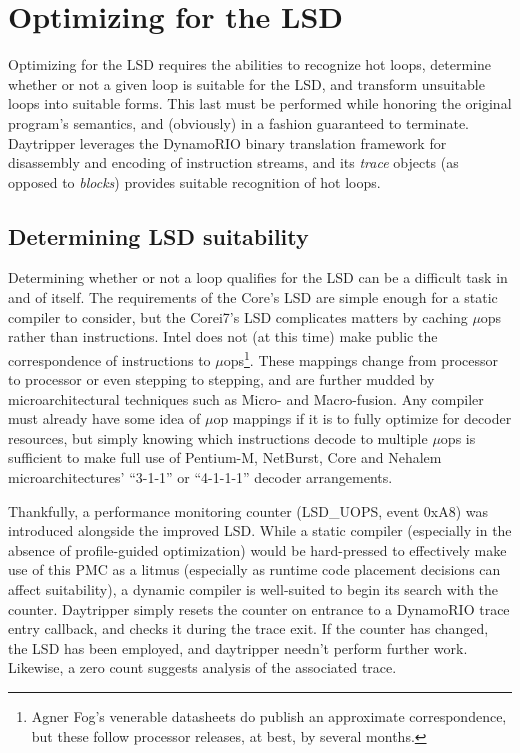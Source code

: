 \documentclass[]{sigplanconf}
\begin{document}
\section{Optimizing for the LSD}
Optimizing for the LSD requires the abilities to recognize hot loops, determine
whether or not a given loop is suitable for the LSD, and transform unsuitable
loops into suitable forms. This last must be performed while honoring the
original program's semantics, and (obviously) in a fashion guaranteed to
terminate. Daytripper leverages the DynamoRIO binary translation framework
for disassembly and encoding of instruction streams, and its \textit{trace}
objects (as opposed to \textit{blocks}) provides suitable recognition of hot
loops.

\subsection{Determining LSD suitability}
Determining whether or not a loop qualifies for the LSD can be a difficult task
in and of itself. The requirements of the Core's LSD are simple
enough for a static compiler to consider, but the Core\texttrademark i7's LSD
complicates matters by caching $\mu$ops rather than instructions. Intel does
not (at this time) make public the correspondence of instructions to $\mu$ops\footnote{Agner Fog's venerable datasheets \cite{agnerfog} do publish an approximate correspondence, but these follow processor releases, at best, by several months.}. These 
mappings change from processor to processor or even stepping to stepping, and
are further mudded by microarchitectural techniques such as Micro- and Macro-fusion. Any
compiler must already have some idea of $\mu$op mappings
if it is to fully optimize for decoder resources, but simply knowing which
instructions decode to multiple $\mu$ops is sufficient to make full use of
Pentium-M, NetBurst, Core and Nehalem microarchitectures' ``3-1-1'' or ``4-1-1-1''
decoder arrangements.

Thankfully, a performance monitoring counter (LSD\_UOPS, event 0xA8) was
introduced alongside the improved LSD. While a static compiler (especially in
the absence of profile-guided optimization) would be hard-pressed to
effectively make use of this PMC as a litmus (especially as runtime code
placement decisions can affect suitability), a dynamic compiler is well-suited
to begin its search with the counter. Daytripper simply resets the counter on
entrance to a DynamoRIO trace entry callback, and checks it during the trace
exit. If the counter has changed, the LSD has been employed, and daytripper
needn't perform further work. Likewise, a zero count suggests analysis of the
associated trace.
\end{document}
